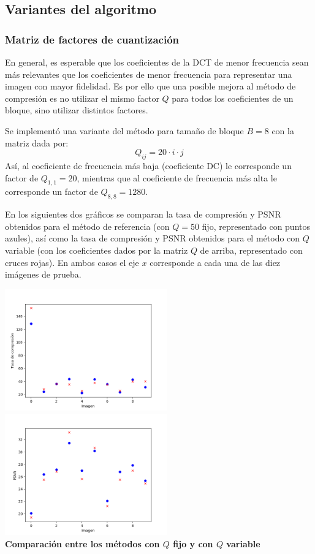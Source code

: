 \documentclass{article}
\begin{document}
\subsection{Variantes del algoritmo}

\subsubsection{Matriz de factores de cuantización}

En general, es esperable que los coeficientes de la DCT de menor frecuencia
sean más relevantes que los coeficientes de menor frecuencia
para representar una imagen con mayor fidelidad.
Es por ello que una posible mejora al método de compresión es no utilizar el
mismo factor $Q$ para todos los coeficientes de un bloque, sino utilizar
distintos factores.

Se implementó una variante del método para tamaño de bloque $B = 8$ con la
matriz dada por:
\[
  Q_{ij} = 20 \cdot i \cdot j
\]
Así, al coeficiente de frecuencia más baja (coeficiente DC)
le corresponde un factor de $Q_{1,1} = 20$,
mientras que al coeficiente de frecuencia más alta
le corresponde un factor de $Q_{8,8} = 1280$.
\medskip

En los siguientes dos gráficos se comparan la tasa de compresión y PSNR obtenidos
para el método de referencia (con $Q = 50$ fijo, representado con puntos azules),
así como la tasa de compresión y PSNR obtenidos
para el método con $Q$ variable (con los coeficientes dados por la matriz $Q$
de arriba, representado con cruces rojas).
En ambos casos el eje $x$ corresponde a cada una de las diez imágenes de prueba.
\begin{center}
  \includegraphics[width=7cm]{../imgs/output/qmatrix_plots/qmatrix_rate.png}
  \includegraphics[width=7cm]{../imgs/output/qmatrix_plots/qmatrix_psnr.png}\\
  {\bf Comparación entre los métodos con $Q$ fijo y con $Q$ variable}
\end{center}
\end{document}
